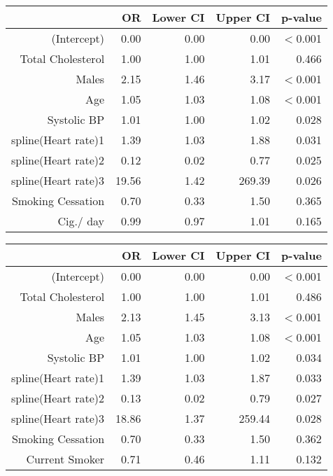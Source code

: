 \documentclass{article}\usepackage[]{graphicx}\usepackage[]{color}
\begin{document}
\begin{table}[ht]
\centering
\begin{tabular}{rrrrr}
  \hline
 & OR & Lower CI & Upper CI & p-value \\ 
  \hline
(Intercept) & 0.00 & 0.00 & 0.00 & $<$0.001 \\ 
  Total Cholesterol & 1.00 & 1.00 & 1.01 & 0.466 \\ 
  Males & 2.15 & 1.46 & 3.17 & $<$0.001 \\ 
  Age & 1.05 & 1.03 & 1.08 & $<$0.001 \\ 
  Systolic BP & 1.01 & 1.00 & 1.02 & 0.028 \\ 
  spline(Heart rate)1 & 1.39 & 1.03 & 1.88 & 0.031 \\ 
  spline(Heart rate)2 & 0.12 & 0.02 & 0.77 & 0.025 \\ 
  spline(Heart rate)3 & 19.56 & 1.42 & 269.39 & 0.026 \\ 
  Smoking Cessation & 0.70 & 0.33 & 1.50 & 0.365 \\ 
  Cig./ day & 0.99 & 0.97 & 1.01 & 0.165 \\ 
   \hline
\end{tabular}
\end{table}

\begin{table}[ht]
\centering
\begin{tabular}{rrrrr}
  \hline
 & OR & Lower CI & Upper CI & p-value \\ 
  \hline
(Intercept) & 0.00 & 0.00 & 0.00 & $<$0.001 \\ 
  Total Cholesterol & 1.00 & 1.00 & 1.01 & 0.486 \\ 
  Males & 2.13 & 1.45 & 3.13 & $<$0.001 \\ 
  Age & 1.05 & 1.03 & 1.08 & $<$0.001 \\ 
  Systolic BP & 1.01 & 1.00 & 1.02 & 0.034 \\ 
  spline(Heart rate)1 & 1.39 & 1.03 & 1.87 & 0.033 \\ 
  spline(Heart rate)2 & 0.13 & 0.02 & 0.79 & 0.027 \\ 
  spline(Heart rate)3 & 18.86 & 1.37 & 259.44 & 0.028 \\ 
  Smoking Cessation & 0.70 & 0.33 & 1.50 & 0.362 \\ 
  Current Smoker & 0.71 & 0.46 & 1.11 & 0.132 \\ 
   \hline
\end{tabular}
\end{table}
\end{document}
